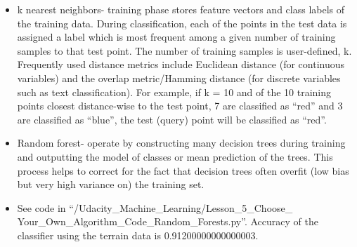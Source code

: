 \documentclass[12pt]{report}
\begin{document}
\begin{itemize}

\item k nearest neighbors- training phase stores feature vectors and class labels of the training data. During classification, each of the points in the test data is assigned a label which is most frequent among a given number of training samples to that test point. The number of training samples is user-defined, k. Frequently used distance metrics include Euclidean distance (for continuous variables) and the overlap metric/Hamming distance (for discrete variables such as text classification). For example, if k = 10 and of the 10 training points closest distance-wise to the test point, 7 are classified as ``red'' and 3 are classified as ``blue'', the test (query) point will be classified as ``red''. 

\item Random forest- operate by constructing many decision trees during training and outputting the model of classes or mean prediction of the trees. This process helps to correct for the fact that decision trees often overfit (low bias but very high variance on) the training set.

\item See code in ``/Udacity\_Machine\_Learning/Lesson\_5\_Choose\_ \\
Your\_Own\_Algorithm\_Code\_Random\_Forests.py''. Accuracy of the classifier using the terrain data is 0.91200000000000003.

\end{itemize}
\end{document}
